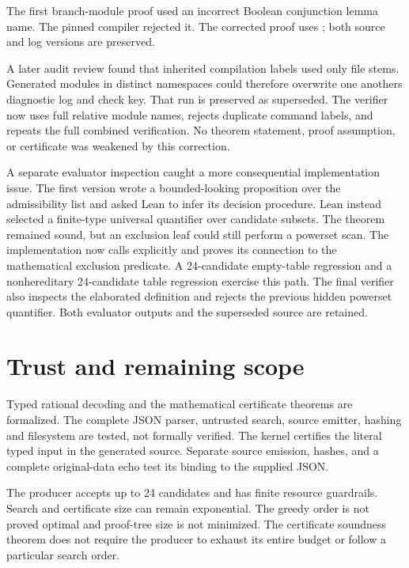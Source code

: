\documentclass[11pt,letterpaper,oneside,openany]{book}
\theoremstyle{quiet}
\newcommand{\code}[1]{\texttt{\detokenize{#1}}}
\begin{document}
The first branch-module proof used an incorrect Boolean conjunction lemma name. The pinned compiler rejected it. The corrected proof uses \code{Bool.and_eq_true_iff}; both source and log versions are preserved.

A later audit review found that inherited compilation labels used only file stems. Generated modules in distinct namespaces could therefore overwrite one another\textquotesingle s diagnostic log and check key. That run is preserved as superseded. The verifier now uses full relative module names, rejects duplicate command labels, and repeats the full combined verification. No theorem statement, proof assumption, or certificate was weakened by this correction.

A separate evaluator inspection caught a more consequential implementation issue. The first version wrote a bounded-looking proposition over the admissibility list and asked Lean to infer its decision procedure. Lean instead selected a finite-type universal quantifier over candidate subsets. The theorem remained sound, but an exclusion leaf could still perform a powerset scan. The implementation now calls \code{List.all} explicitly and proves its connection to the mathematical exclusion predicate. A 24-candidate empty-table regression and a nonhereditary 24-candidate table regression exercise this path. The final verifier also inspects the elaborated definition and rejects the previous hidden powerset quantifier. Both evaluator outputs and the superseded source are retained.

\section{Trust and remaining scope}

Typed rational decoding and the mathematical certificate theorems are formalized. The complete JSON parser, untrusted search, source emitter, hashing and filesystem are tested, not formally verified. The kernel certifies the literal typed input in the generated source. Separate source emission, hashes, and a complete original-data echo test its binding to the supplied JSON.

The producer accepts up to 24 candidates and has finite resource guardrails. Search and certificate size can remain exponential. The greedy order is not proved optimal and proof-tree size is not minimized. The certificate soundness theorem does not require the producer to exhaust its entire budget or follow a particular search order.
\end{document}
